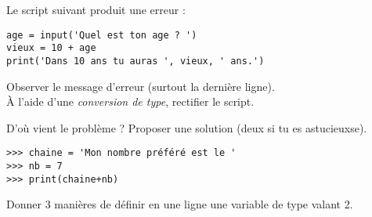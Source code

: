 \begin{exercice}

    Le script suivant produit une erreur :
\begin{verbatim}
age = input('Quel est ton age ? ')
vieux = 10 + age
print('Dans 10 ans tu auras ', vieux, ' ans.')
\end{verbatim}
    Observer le message d'erreur (surtout la dernière ligne).\\
    À l'aide d'une \textit{conversion de type}, rectifier le script.
\end{exercice}
\begin{exercice}
D'où vient le problème ? Proposer une solution (deux si tu es astucieu\cdot x\cdot se).
\begin{verbatim}
>>> chaine = 'Mon nombre préféré est le '
>>> nb = 7
>>> print(chaine+nb)
\end{verbatim}
\end{exercice}

\begin{exercice}
    Donner 3 manières de définir en une ligne une variable  de type  valant 2.
\end{exercice}

